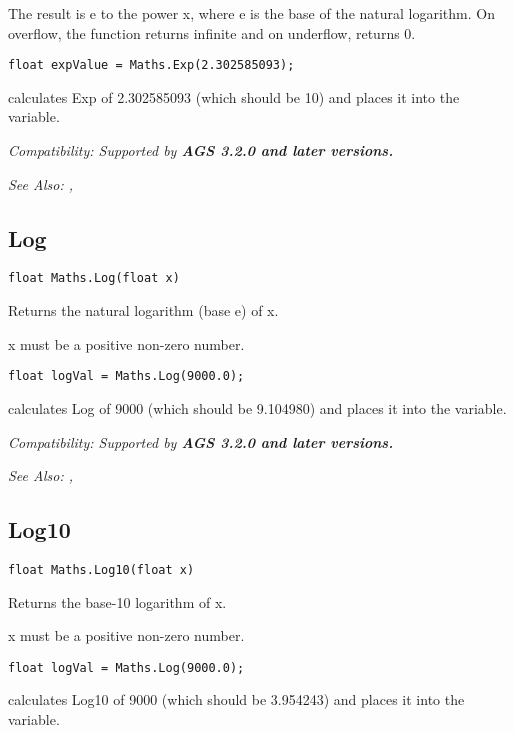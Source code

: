 The result is e to the power x, where e is the base of the natural logarithm.
On overflow, the function returns infinite and on underflow, returns 0.

\begin{verbatim}
float expValue = Maths.Exp(2.302585093);
\end{verbatim}
calculates Exp of 2.302585093 (which should be 10) and places it into the variable.

\it{Compatibility:} Supported by \bf{AGS 3.2.0} and later versions.

\it{See Also:} , 


\subsection{Log}\label{Maths.Log}%

\begin{verbatim}
float Maths.Log(float x)
\end{verbatim}
Returns the natural logarithm (base e) of x.

x must be a positive non-zero number.

\begin{verbatim}
float logVal = Maths.Log(9000.0);
\end{verbatim}
calculates Log of 9000 (which should be 9.104980) and places it into the variable.

\it{Compatibility:} Supported by \bf{AGS 3.2.0} and later versions.

\it{See Also:} , 


\subsection{Log10}\label{Maths.Log10}%

\begin{verbatim}
float Maths.Log10(float x)
\end{verbatim}
Returns the base-10 logarithm of x.

x must be a positive non-zero number.

\begin{verbatim}
float logVal = Maths.Log(9000.0);
\end{verbatim}
calculates Log10 of 9000 (which should be 3.954243) and places it into the variable.

